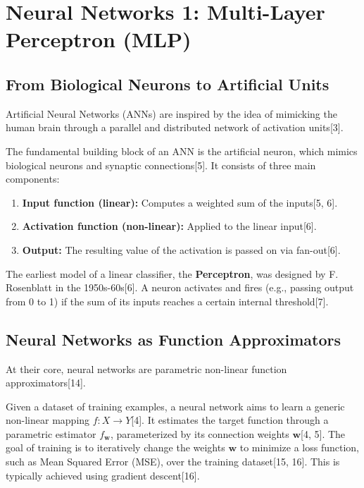 \chapter*{Neural Networks 1: Multi-Layer Perceptron (MLP)}

\section*{From Biological Neurons to Artificial Units}

Artificial Neural Networks (ANNs) are inspired by the idea of mimicking the human brain through a parallel and distributed network of activation units[3].

\begin{definition}
The fundamental building block of an ANN is the artificial neuron, which mimics biological neurons and synaptic connections[5]. It consists of three main components:
\begin{enumerate}
    \item \textbf{Input function (linear):} Computes a weighted sum of the inputs[5, 6].
    \item \textbf{Activation function (non-linear):} Applied to the linear input[6].
    \item \textbf{Output:} The resulting value of the activation is passed on via fan-out[6].
\end{enumerate}
\end{definition}

The earliest model of a linear classifier, the \textbf{Perceptron}, was designed by F. Rosenblatt in the 1950s-60s[6]. A neuron activates and fires (e.g., passing output from 0 to 1) if the sum of its inputs reaches a certain internal threshold[7].

\section*{Neural Networks as Function Approximators}

At their core, neural networks are parametric non-linear function approximators[14].

\begin{definition}
Given a dataset of training examples, a neural network aims to learn a generic non-linear mapping $f: X \to Y$[4]. It estimates the target function through a parametric estimator $f_{\mathbf{w}}$, parameterized by its connection weights $\mathbf{w}$[4, 5]. The goal of training is to iteratively change the weights $\mathbf{w}$ to minimize a loss function, such as Mean Squared Error (MSE), over the training dataset[15, 16]. This is typically achieved using gradient descent[16].
\end{definition}

